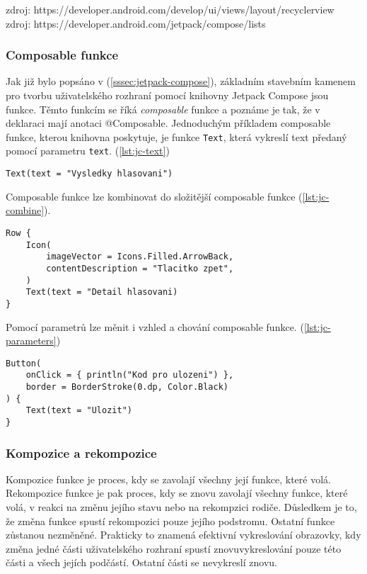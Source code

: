 \vspace*{10px}
\noindent zdroj: https://developer.android.com/develop/ui/views/layout/recyclerview
\noindent zdroj: https://developer.android.com/jetpack/compose/lists

\vspace*{10px}

\subsubsection*{Composable funkce}
Jak již bylo popsáno v (\ref{sssec:jetpack-compose}), základním stavebním kamenem pro tvorbu uživatelského rozhraní pomocí knihovny Jetpack Compose jsou funkce. Těmto funkcím se říká \textit{composable} funkce a poznáme je tak, že v deklaraci mají anotaci @Composable. Jednoduchým příkladem composable funkce, kterou knihovna poskytuje, je funkce \lstinline|Text|, která vykreslí text předaný pomocí parametru \lstinline|text|. (\ref{lst:jc-text})

\begin{lstlisting}[caption={Příklad použití composable funkce Text.}, label={lst:jc-text}]
Text(text = "Vysledky hlasovani")
\end{lstlisting}

\noindent Composable funkce lze kombinovat do složitější composable funkce (\ref{lst:jc-combine}).

\begin{lstlisting}[caption={Příklad skládání composable funkcí. Vykreslí ikonku a text vedle sebe.}, label={lst:jc-combine}, tabsize=2]
Row {
	Icon(
		imageVector = Icons.Filled.ArrowBack,
		contentDescription = "Tlacitko zpet",
	)
	Text(text = "Detail hlasovani)
}
\end{lstlisting}

\noindent Pomocí parametrů lze měnit i vzhled a chování composable funkce. (\ref{lst:jc-parameters})

\begin{lstlisting}[caption={Příklad parametrů pro změnu vzhledu a chování.}, label={lst:jc-parameters}, tabsize=2]
Button(
	onClick = { println("Kod pro ulozeni") },
	border = BorderStroke(0.dp, Color.Black)
) {
	Text(text = "Ulozit")
}
\end{lstlisting}

\vspace*{10px}

\subsubsection*{Kompozice a rekompozice}
Kompozice funkce je proces, kdy se zavolají všechny její funkce, které volá. Rekompozice funkce je pak proces, kdy se znovu zavolají všechny funkce, které volá, v reakci na změnu jejího stavu nebo na rekompzici rodiče. Důsledkem je to, že změna funkce spustí  rekompozici pouze jejího podstromu. Ostatní funkce zůstanou nezměněné. Prakticky to znamená efektivní vykreslování obrazovky, kdy změna jedné části uživatelského rozhraní spustí znovuvykreslování pouze této části a všech jejích podčástí. Ostatní části se nevykreslí znovu.

